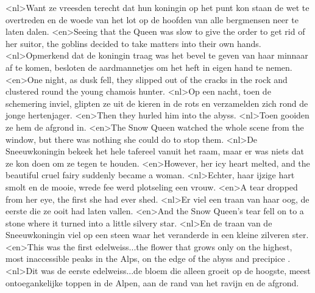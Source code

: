 <nl>Want ze vreesden terecht dat hun koningin op het punt kon staan de wet te overtreden en de woede van  het lot op de hoofden van alle bergmensen neer te laten dalen.
<en>Seeing that the Queen was slow to give the order to get rid of her suitor, the goblins decided to take matters into their own hands.
<nl>Opmerkend dat de koningin traag was het bevel te geven van haar minnaar af te komen, besloten de aardmannetjes om het heft in eigen hand te nemen.
<en>One night, as dusk fell, they slipped out of the cracks in the rock and clustered round the young chamois hunter.
<nl>Op een nacht, toen de schemering inviel, glipten ze uit de kieren in de rots en verzamelden zich rond de jonge hertenjager.
<en>Then they hurled him into the abyss.
<nl>Toen gooiden ze hem de afgrond in.
<en>The Snow Queen watched the whole scene from the window, but there was nothing she could do to stop them.
<nl>De Sneeuwkoningin bekeek het hele tafereel vanuit het raam, maar er was niets dat ze kon doen om ze tegen te houden.
<en>However, her icy heart melted, and the beautiful cruel fairy suddenly became a woman.
<nl>Echter, haar ijzige hart smolt en de mooie, wrede fee werd plotseling een vrouw.
<en>A tear dropped from her eye, the first she had ever shed.
<nl>Er viel een traan van haar oog, de eerste die ze ooit had laten vallen.
<en>And the Snow Queen’s tear fell on to a stone where it turned into a little silvery star.
<nl>En de traan van de Sneeuwkoningin viel op een steen waar het veranderde in een kleine zilveren ster.
<en>This was the first edelweiss...the flower that grows only on the highest, most inaccessible peaks in the Alps, on the edge of the abyss and precipice .
<nl>Dit was de eerste edelweiss...de bloem die alleen groeit op de hoogste, meest ontoegankelijke toppen in de Alpen, aan de rand van het ravijn en de afgrond.
